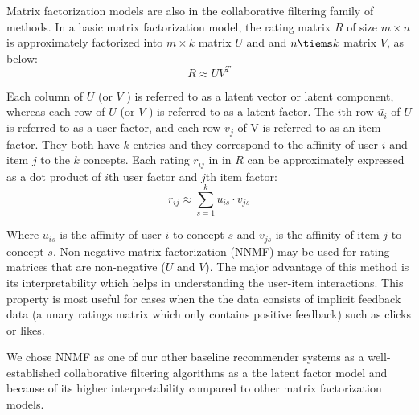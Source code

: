        Matrix factorization models \cite{koren20009mf} are also in the collaborative filtering family of methods. In a basic matrix factorization model, the rating matrix $R$ of size $m\times n$ is approximately factorized into $m\times k$ matrix $U$ and and $n\tiems k$ matrix $V$, as below:
       \begin{equation}
           R\approx UV^T
       \end{equation}
       
       Each column of $U$ (or $V$ ) is referred to as a latent vector or latent component, whereas each row of $U$ (or $V$ ) is referred to as a latent factor. The $i$th row $\bar{u_i}$ of $U$ is referred to as a user factor, and each row $\bar{v_j}$ of V is referred to as an item factor. They both have $k$ entries and they correspond to the affinity of user $i$ and item $j$ to the $k$ concepts.
       Each rating $r_{ij}$ in in $R$ can be approximately expressed as a dot product of $i$th user factor and $j$th item factor:
       \begin{equation}
           r_{ij} \approx \sum_{s=1}^{k} u_{is} \cdot v_{js}
       \end{equation}
       
       Where $u_{is}$ is the affinity of user $i$ to concept $s$ and $v_{js}$ is the affinity of item $j$ to concept $s$. 
       Non-negative matrix factorization (NNMF) \cite{lee2001algorithms,zhang2006learning} may be used for rating matrices that are non-negative ($U$ and $V$). The major advantage of this method is its interpretability which helps in understanding the user-item interactions. This property is most useful for cases when the the data consists of implicit feedback data (a unary ratings matrix which only contains positive feedback) such as clicks or likes.
       
       We chose NNMF as one of our other baseline recommender systems as a well-established collaborative filtering algorithms as a the latent factor model and because of its higher interpretability compared to other matrix factorization models.
       
       

        
        
